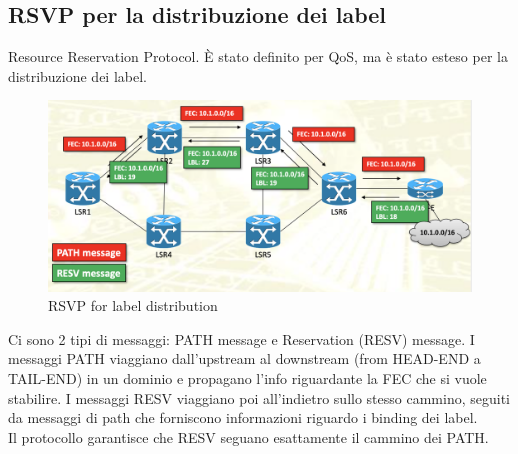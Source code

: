 \documentclass{article}
\begin{document}
\subsection{RSVP per la distribuzione dei label} Resource Reservation Protocol. È stato definito per QoS, ma è stato esteso per la distribuzione dei label. 
\begin{figure}[H]
    \centering
    \includegraphics[scale=0.4]{figures/RSVP label distribution.png}
    \caption{RSVP for label distribution}
\end{figure}
Ci sono 2 tipi di messaggi: PATH message e Reservation (RESV) message. I messaggi PATH viaggiano dall'upstream al downstream (from HEAD-END a TAIL-END) in un dominio e propagano l'info riguardante la FEC che si vuole stabilire. I messaggi RESV viaggiano poi all'indietro sullo stesso cammino, seguiti da messaggi di path che forniscono informazioni riguardo i binding dei label. \\ Il protocollo garantisce che RESV seguano esattamente il cammino dei PATH.
\end{document}

